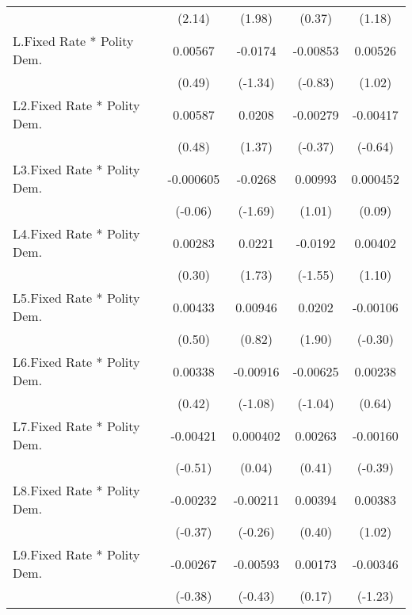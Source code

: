 {\begin{longtable}{l*{4}{c}}
                &   (2.14)         &   (1.98)         &   (0.37)         &   (1.18)         \\
[1em]
L.Fixed Rate * Polity Dem.&  0.00567         &  -0.0174         & -0.00853         &  0.00526         \\
                &   (0.49)         &  (-1.34)         &  (-0.83)         &   (1.02)         \\
[1em]
L2.Fixed Rate * Polity Dem.&  0.00587         &   0.0208         & -0.00279         & -0.00417         \\
                &   (0.48)         &   (1.37)         &  (-0.37)         &  (-0.64)         \\
[1em]
L3.Fixed Rate * Polity Dem.&-0.000605         &  -0.0268         &  0.00993         & 0.000452         \\
                &  (-0.06)         &  (-1.69)         &   (1.01)         &   (0.09)         \\
[1em]
L4.Fixed Rate * Polity Dem.&  0.00283         &   0.0221         &  -0.0192         &  0.00402         \\
                &   (0.30)         &   (1.73)         &  (-1.55)         &   (1.10)         \\
[1em]
L5.Fixed Rate * Polity Dem.&  0.00433         &  0.00946         &   0.0202         & -0.00106         \\
                &   (0.50)         &   (0.82)         &   (1.90)         &  (-0.30)         \\
[1em]
L6.Fixed Rate * Polity Dem.&  0.00338         & -0.00916         & -0.00625         &  0.00238         \\
                &   (0.42)         &  (-1.08)         &  (-1.04)         &   (0.64)         \\
[1em]
L7.Fixed Rate * Polity Dem.& -0.00421         & 0.000402         &  0.00263         & -0.00160         \\
                &  (-0.51)         &   (0.04)         &   (0.41)         &  (-0.39)         \\
[1em]
L8.Fixed Rate * Polity Dem.& -0.00232         & -0.00211         &  0.00394         &  0.00383         \\
                &  (-0.37)         &  (-0.26)         &   (0.40)         &   (1.02)         \\
[1em]
L9.Fixed Rate * Polity Dem.& -0.00267         & -0.00593         &  0.00173         & -0.00346         \\
                &  (-0.38)         &  (-0.43)         &   (0.17)         &  (-1.23)         \\

\end{longtable}}
